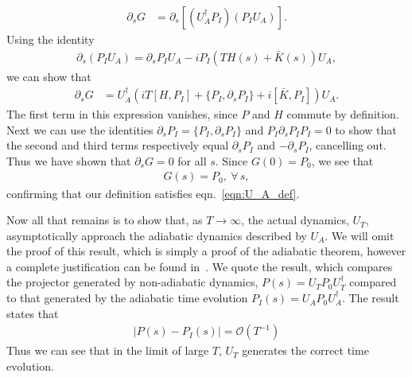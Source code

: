 \begin{align}
    \partial_s  G &= \partial_s \left [ ( U_A^\dag  P_I)( P_I  U_A) \right ].
\end{align}
Using the identity
\begin{align}
    \partial_s ( P_I  U_A) = \partial_s P_I  U_A -i  P_I \left ( T H(s) + \bar K(s)  \right )  U_A,
\end{align}
we can show that
\begin{align}
    \partial_s  G &= 
    U_A^\dag \left ( iT [H,P_I] + \{P_I,\partial_s P_I\}  + i [\bar K,P_I] \right )U_A.
\end{align}
The first term in this expression vanishes, since $P$ and $H$ commute by definition. Next we can use the identities $\partial_s P_I = \{P_I, \partial_s P_I\}$ and $P_I \partial_s P_I P_I = 0$ to show that the second and third terms respectively equal $\partial_s P_I$ and $-\partial_s P_I$, cancelling out. Thus we have shown that $\partial_s G = 0$ for all $s$. Since $G(0) = P_0$, we see that
\begin{align}
    G(s) = P_0, \  \forall\, s,
\end{align}
confirming that our definition satisfies eqn.~\ref{eqn:U_A_def}.\par
Now all that remains is to show that, as $ T \rightarrow \infty$, the actual dynamics, $U_T$, asymptotically approach the adiabatic dynamics described by $U_A$. We will omit the proof of this result, which is simply a proof of the adiabatic theorem, however a complete justification can be found in~\cite{avron_adiabatic_1987}. We quote the result, which compares the projector generated by non-adiabatic dynamics, $P(s) = U_T P_0 U^{\dag}_T$ compared to that generated by the adiabatic time evolution $P_I(s) = U_A P_0 U^{\dag}_A$. The result states that
\begin{align}
    |P(s) - P_I(s)| = \mathcal O (T^{-1})
\end{align}
Thus we can see that in the limit of large $T$, $U_T$ generates the correct time evolution.
